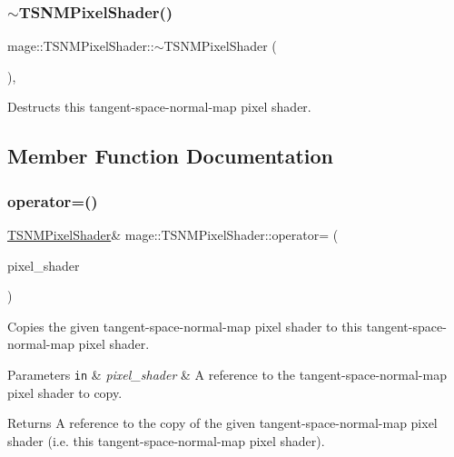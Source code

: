 \subsubsection{\texorpdfstring{$\sim$\+T\+S\+N\+M\+Pixel\+Shader()}{~TSNMPixelShader()}}
{\footnotesize\ttfamily mage\+::\+T\+S\+N\+M\+Pixel\+Shader\+::$\sim$\+T\+S\+N\+M\+Pixel\+Shader (\begin{DoxyParamCaption}{ }\end{DoxyParamCaption})\hspace{0.3cm}{\ttfamily [virtual]}, {\ttfamily [default]}}

Destructs this tangent-\/space-\/normal-\/map pixel shader. 

\subsection{Member Function Documentation}
\hypertarget{classmage_1_1_t_s_n_m_pixel_shader_a8c9bc92d544b088e9530f8f47df2b4a6}{}\label{classmage_1_1_t_s_n_m_pixel_shader_a8c9bc92d544b088e9530f8f47df2b4a6} 
\subsubsection{\texorpdfstring{operator=()}{operator=()}\hspace{0.1cm}{\footnotesize\ttfamily [1/2]}}
{\footnotesize\ttfamily \hyperlink{classmage_1_1_t_s_n_m_pixel_shader}{T\+S\+N\+M\+Pixel\+Shader}\& mage\+::\+T\+S\+N\+M\+Pixel\+Shader\+::operator= (\begin{DoxyParamCaption}\item[{const \hyperlink{classmage_1_1_t_s_n_m_pixel_shader}{T\+S\+N\+M\+Pixel\+Shader} \&}]{pixel\+\_\+shader }\end{DoxyParamCaption})\hspace{0.3cm}{\ttfamily [delete]}}

Copies the given tangent-\/space-\/normal-\/map pixel shader to this tangent-\/space-\/normal-\/map pixel shader.


\begin{DoxyParams}[1]{Parameters}
\mbox{\tt in}  & {\em pixel\+\_\+shader} & A reference to the tangent-\/space-\/normal-\/map pixel shader to copy. \\
\hline
\end{DoxyParams}
\begin{DoxyReturn}{Returns}
A reference to the copy of the given tangent-\/space-\/normal-\/map pixel shader (i.\+e. this tangent-\/space-\/normal-\/map pixel shader). 
\end{DoxyReturn}
\hypertarget{classmage_1_1_t_s_n_m_pixel_shader_a0d714c73017f9bb9b273b2d2a276ab5f}{}\label{classmage_1_1_t_s_n_m_pixel_shader_a0d714c73017f9bb9b273b2d2a276ab5f} 
